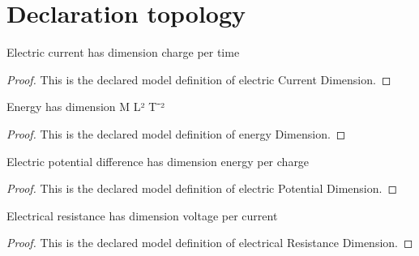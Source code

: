 \section{Declaration topology}
\begin{definition}
  \label{def:physics:phyx-mini-0978:phyxminiproblems-problemphyxmini0978-electriccurrentdimension}
  Electric current has dimension charge per time
\end{definition}
\begin{proof}
  This is the declared model definition of electric Current Dimension.
\end{proof}
\begin{definition}
  \label{def:physics:phyx-mini-0978:phyxminiproblems-problemphyxmini0978-energydimension}
  Energy has dimension M L² T⁻²
\end{definition}
\begin{proof}
  This is the declared model definition of energy Dimension.
\end{proof}
\begin{definition}
  \label{def:physics:phyx-mini-0978:phyxminiproblems-problemphyxmini0978-electricpotentialdimension}
  Electric potential difference has dimension energy per charge
\end{definition}
\begin{proof}
  This is the declared model definition of electric Potential Dimension.
\end{proof}
\begin{definition}
  \label{def:physics:phyx-mini-0978:phyxminiproblems-problemphyxmini0978-electricalresistancedimension}
  Electrical resistance has dimension voltage per current
\end{definition}
\begin{proof}
  This is the declared model definition of electrical Resistance Dimension.
\end{proof}

